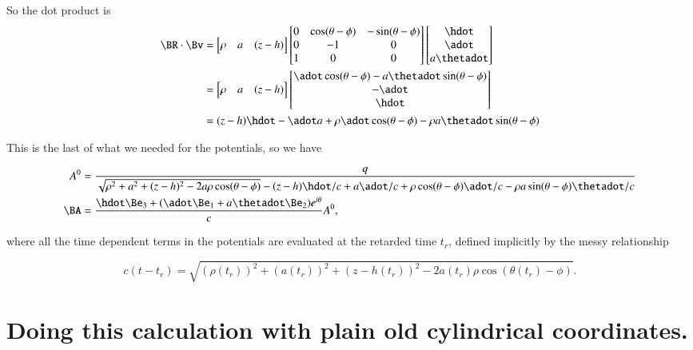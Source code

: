 So the dot product is
\begin{align*}
\BR \cdot \Bv 
&=
\begin{bmatrix}
\rho &
a & 
(z - h)
\end{bmatrix}
\begin{bmatrix}
0 & \cos(\theta-\phi)  & - \sin(\theta - \phi) \\
0 & - 1  & 0 \\
1 & 0 & 0 \\
\end{bmatrix}
\begin{bmatrix}
\hdot \\
\adot \\
a \thetadot
\end{bmatrix} \\
&=
\begin{bmatrix}
\rho &
a & 
(z - h)
\end{bmatrix}
\begin{bmatrix}
\adot \cos(\theta - \phi) - a \thetadot \sin(\theta - \phi) \\
- \adot \\
\hdot
\end{bmatrix} \\
&=
(z - h) \hdot - \adot a + \rho \adot \cos(\theta - \phi) - \rho a \thetadot \sin(\theta - \phi) 
\end{align*}

This is the last of what we needed for the potentials, so we have

\begin{align}\label{eqn:matrixVectorPotentials:250}
A^0 &= \frac{q}{
\sqrt{\rho^2 + a^2 + (z -h)^2 - 2 a \rho \cos(\theta - \phi)} 
-(z - h) \hdot/c + a \adot/c + \rho \cos(\theta - \phi) \adot/c - \rho a \sin(\theta - \phi) \thetadot/c
} \\
\BA &= \frac{ \hdot \Be_3 + (\adot \Be_1 + a \thetadot \Be_2) e^{i\theta} }{c} A^0,
\end{align}

where all the time dependent terms in the potentials are evaluated at the retarded time $t_r$, defined implicitly by the messy relationship

\begin{equation}\label{eqn:matrixVectorPotentials:270}
c(t - t_r) = \sqrt{(\rho(t_r))^2 + (a(t_r))^2 + (z -h(t_r))^2 - 2 a(t_r) \rho \cos(\theta(t_r) - \phi)} .
\end{equation}

\section{Doing this calculation with plain old cylindrical coordinates.}


